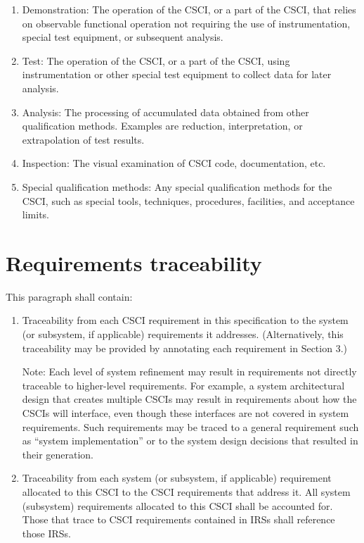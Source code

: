 \documentclass{fidata-report-template}
\begin{document}
\begin{enumerate}
\itemsep1pt\parskip0pt
\item
  Demonstration: The operation of the CSCI, or a part of the CSCI, that
  relies on observable functional operation not requiring the use of
  instrumentation, special test equipment, or subsequent analysis.
\item
  Test: The operation of the CSCI, or a part of the CSCI, using
  instrumentation or other special test equipment to collect data for
  later analysis.
\item
  Analysis: The processing of accumulated data obtained from other
  qualification methods. Examples are reduction, interpretation, or
  extrapolation of test results.
\item
  Inspection: The visual examination of CSCI code, documentation, etc.
\item
  Special qualification methods: Any special qualification methods for
  the CSCI, such as special tools, techniques, procedures, facilities,
  and acceptance limits.
\end{enumerate}

\section{Requirements traceability}

This paragraph shall contain:

\begin{enumerate}
\itemsep1pt\parskip0pt
\item
  Traceability from each CSCI requirement in this specification to the
  system (or subsystem, if applicable) requirements it addresses.
  (Alternatively, this traceability may be provided by annotating each
  requirement in Section 3.)

  Note: Each level of system refinement
  may result in requirements not directly traceable to higher-level
  requirements. For example, a system architectural design that creates
  multiple CSCIs may result in requirements about how the CSCIs will
  interface, even though these interfaces are not covered in system
  requirements. Such requirements may be traced to a general requirement
  such as ``system implementation'' or to the system design decisions
  that resulted in their generation.
\item
  Traceability from each system (or subsystem, if applicable)
  requirement allocated to this CSCI to the CSCI requirements that
  address it. All system (subsystem) requirements allocated to this CSCI
  shall be accounted for. Those that trace to CSCI requirements
  contained in IRSs shall reference those IRSs.
\end{enumerate}
\end{document}
